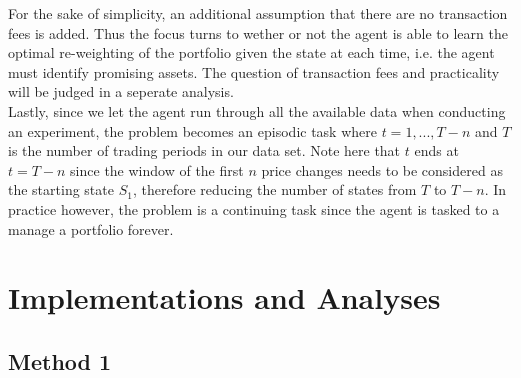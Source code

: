 \documentclass[a4paper,12pt]{article}
\begin{document}
For the sake of simplicity, an additional assumption that there are no transaction fees is added. Thus the focus turns to wether or not the agent is able to learn the optimal re-weighting of the portfolio given the state at each time, i.e. the agent must identify promising assets. The question of transaction fees and practicality will be judged in a seperate analysis. \\

Lastly, since we let the agent run through all the available data when conducting an experiment, the problem becomes an episodic task where $t=1,...,T-n$ and $T$ is the number of trading periods in our data set. Note here that $t$ ends at $t=T-n$ since the window of the first $n$ price changes needs to be considered as the starting state $S_1$, therefore reducing the number of states from $T$ to $T-n$. In practice however, the problem is a continuing task since the agent is tasked to a manage a portfolio forever.

\section{Implementations and Analyses}

\subsection{Method 1}
\end{document}
